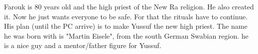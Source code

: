 \begin{npcBox}[title=Farouk]
    \begin{consequences}
    \item {}
    \item {}
    \item {}
    \end{consequences}

    \begin{npcDescription}
    Farouk is 80 years old and the high priest of the New Ra religion. He also created it. Now he just wants everyone to be safe. For that the rituals have to continue. His plan (until the PC arrive) is to make Yussuf the new high priest. The name he was born with is "Martin Eisele", from the south German Swabian region.
    he is a nice guy and a mentor/father figure for Yussuf.

    \end{npcDescription}

\end{npcBox}

\newpage

